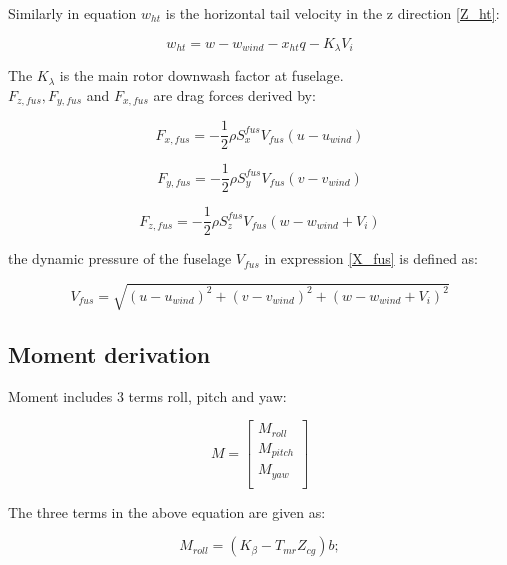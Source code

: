 Similarly in equation $w_{ht}$ is the horizontal tail velocity in the z direction \ref{Z_ht}:

\begin{equation}
	w_{ht}=w-w_{wind}-x_{ht}q-K_{\lambda}V_i
\end{equation} 

The $K_{\lambda}$ is the main rotor downwash factor at fuselage.\\

$F_{z,fus} , F_{y,fus}$ and $F_{x,fus}$ are drag forces derived by:

\begin{equation}
	F_{x,fus}=-\frac{1}{2} \rho S_x^{fus} V_{fus} (u-u_{wind})
	\label{X_fus}
\end{equation}

\begin{equation}\label{Y_fus}
	F_{y,fus}=-\frac{1}{2} \rho S_y^{fus} V_{fus} (v-v_{wind})
\end{equation}

\begin{equation}\label{Z_fus}
	F_{z,fus}=-\frac{1}{2} \rho S_z^{fus} V_{fus} (w-w_{wind}+V_i)
\end{equation}

the dynamic pressure of the fuselage $V_{fus}$ in expression \ref{X_fus} is defined as:

\begin{equation}
	V_{fus}=\sqrt{(u-u_{wind})^2+(v-v_{wind})^2+(w-w_{wind}+V_i)^2}
\end{equation}

\subsection{Moment derivation} \label{Moment section}

Moment includes 3 terms roll, pitch and yaw:

\begin{equation}
	M =\begin{bmatrix}
		M_{roll}\\
		M_{pitch}\\
		M_{yaw}\\
	\end{bmatrix}
\end{equation}

The three terms in the above equation are given as:

\begin{equation}
	M_{roll} = (K_{\beta}-T_{mr}Z_{cg})b;%
\end{equation}

